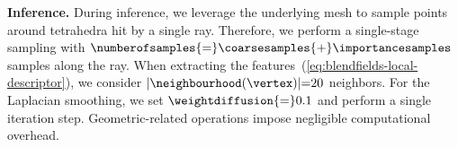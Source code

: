     \noindent\textbf{Inference.}
    During inference, we leverage the underlying mesh to sample points around
    tetrahedra hit by a single ray.
    Therefore, we perform a single-stage sampling with
    $\numberofsamples{=}\coarsesamples{+}\importancesamples$ samples along the
    ray.
    When extracting the features~(\cref{eq:blendfields-local-descriptor}), we
    consider $|\neighbourhood(\vertex)|{=}20$ neighbors.
    For the Laplacian smoothing, we set $\weightdiffusion{=}0.1$ and perform a
    single iteration step.
    Geometric-related operations impose negligible computational overhead.

